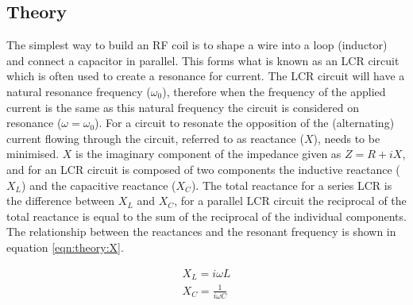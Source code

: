 \subsection{Theory}




The simplest way to build an \ac{RF} coil is to shape a wire into a loop (inductor) and connect a capacitor in parallel. This forms what is known as an LCR circuit which is often used to create a resonance for current. The LCR circuit will have a natural resonance frequency ($\omega_0$), therefore when the frequency of the applied current is the same as this natural frequency the circuit is considered on resonance ($\omega=\omega_0$). For a circuit to resonate the opposition of the (alternating) current flowing through the circuit, referred to as reactance ($X$), needs to be minimised. $X$ is the imaginary component of the impedance given as $Z = R+iX$, and for an LCR circuit is composed of two components the inductive reactance ($X_L$) and the capacitive reactance ($X_C$). The total reactance for a series LCR is the difference between $X_L$ and $X_C$, for a parallel LCR circuit the reciprocal of the total reactance is equal to the sum of the reciprocal of the individual components. The relationship between the reactances and the resonant frequency is shown in equation \ref{eqn:theory:X}.

\begin{equation}
\begin{gathered}
    X_L = i\omega L \\
    X_C = \frac{1}{i\omega C}
    \label{eqn:theory:X}
\end{gathered}
\end{equation}

